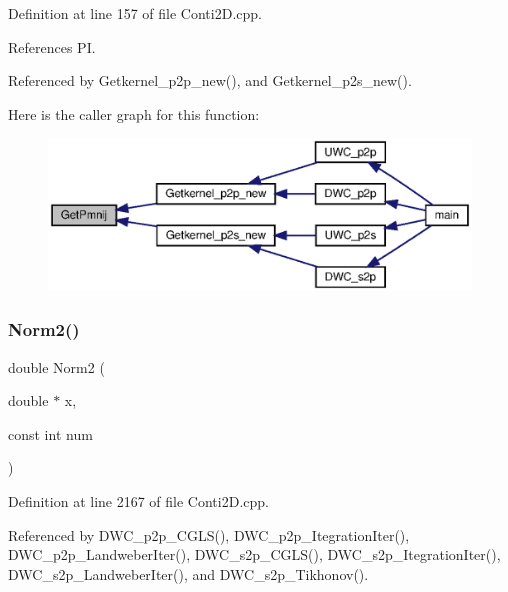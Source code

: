 Definition at line 157 of file Conti2\+D.\+cpp.



References PI.



Referenced by Getkernel\+\_\+p2p\+\_\+new(), and Getkernel\+\_\+p2s\+\_\+new().

Here is the caller graph for this function\+:\nopagebreak
\begin{figure}[H]
\begin{center}
\leavevmode
\includegraphics[width=350pt]{Conti2D_8cpp_a4bb34ae88cf16e429505f9eb746384cd_a4bb34ae88cf16e429505f9eb746384cd_icgraph}
\end{center}
\end{figure}
\mbox{\label{Conti2D_8cpp_a98827c14ed7072c96834f20205c7a916_a98827c14ed7072c96834f20205c7a916}} 
\subsubsection{Norm2()}
{\footnotesize\ttfamily double Norm2 (\begin{DoxyParamCaption}\item[{double $\ast$}]{x,  }\item[{const int}]{num }\end{DoxyParamCaption})}



Definition at line 2167 of file Conti2\+D.\+cpp.



Referenced by D\+W\+C\+\_\+p2p\+\_\+\+C\+G\+L\+S(), D\+W\+C\+\_\+p2p\+\_\+\+Itegration\+Iter(), D\+W\+C\+\_\+p2p\+\_\+\+Landweber\+Iter(), D\+W\+C\+\_\+s2p\+\_\+\+C\+G\+L\+S(), D\+W\+C\+\_\+s2p\+\_\+\+Itegration\+Iter(), D\+W\+C\+\_\+s2p\+\_\+\+Landweber\+Iter(), and D\+W\+C\+\_\+s2p\+\_\+\+Tikhonov().

